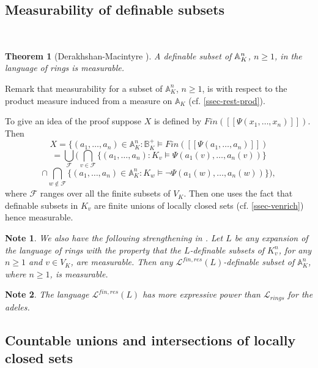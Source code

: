\documentclass[12pt]{amsart}
\def\A{\mathbb{A}}
\def\B{\mathbb{B}}
\def\cL{\mathcal{L}}
\def\cL{\mathcal{L}}
\newtheorem{thm}{Theorem}[section]
\numberwithin{equation}{section}
\newtheorem{note}{Note}[section]
\begin{document}
\medskip

\subsection{\bf Measurability of definable subsets}\label{ssec-defmeas} 

\

\medskip

\begin{thm}[Derakhshan-Macintyre {\cite{DM-ad}}]\label{th-def-meas} A definable subset of $\Bbb A_K^n$, $n\geq 1$, in the language of rings is measurable.\end{thm}
Remark that measurability for a subset of $\A_K^n$, $n\geq 1$, is with respect to the product measure induced from a measure 
on $\A_K$ (cf. \ref{ssec-rest-prod}).

To give an idea of the proof suppose $X$ is defined by $Fin([[\Psi(x_1,\dots,x_n)]])$. 
Then
$$X=\{(a_1,\dots,a_n)\in \A_K^n: \B_K^+\models Fin([[\Psi(a_1,\dots,a_n)]])$$
$$=\bigcup_{\mathcal{F}} (\bigcap_{v\in \mathcal{F}} \{(a_1,\dots,a_n): K_v\models \Psi(a_1(v),\dots,a_n(v))\}$$
$$\cap \bigcap_{w\notin \mathcal{F}} \{(a_1,\dots,a_n)\in \A_K^n: K_w\models \neg \Psi(a_1(w),\dots,a_n(w))\}),$$
where $\mathcal{F}$ ranges over all the finite subsets of $V_K$.
Then one uses the fact that definable subsets in $K_v$ are finite unions of locally closed sets (cf. \ref{ssec-venrich}) hence measurable. 

\begin{note} We also have the following strengthening in \cite{DM-ad}. 
Let $L$ be any expansion of the language of rings with the property that the $L$-definable subsets of $K_v^n$, for any $n\geq 1$ and $v\in V_K$, are measurable. 
Then any $\cL^{fin,res}(L)$-definable subset of $\A_K^n$, where $n\geq 1$, is measurable.
\end{note}

\begin{note}The language $\cL^{fin,res}(L)$ has more expressive power than $\cL_{rings}$ for the adeles.\end{note}

\medskip

\subsection{\bf Countable unions and intersections of locally closed sets} \label{ssec-unions}

\

\medskip
\end{document}
